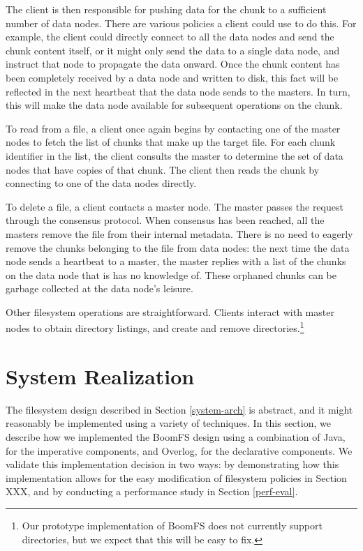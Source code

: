 \documentclass{article}
\begin{document}
The client is then responsible for pushing data for the chunk to a
sufficient number of data nodes. There are various policies a client
could use to do this. For example, the client could directly connect
to all the data nodes and send the chunk content itself, or it might
only send the data to a single data node, and instruct that node to
propagate the data onward. Once the chunk content has been completely
received by a data node and written to disk, this fact will be
reflected in the next heartbeat that the data node sends to the
masters. In turn, this will make the data node available for
subsequent operations on the chunk.

To read from a file, a client once again begins by contacting one of
the master nodes to fetch the list of chunks that make up the target
file. For each chunk identifier in the list, the client consults the
master to determine the set of data nodes that have copies of that
chunk. The client then reads the chunk by connecting to one of the
data nodes directly.

To delete a file, a client contacts a master node. The master passes
the request through the consensus protocol. When consensus has been
reached, all the masters remove the file from their internal
metadata. There is no need to eagerly remove the chunks belonging to
the file from data nodes: the next time the data node sends a
heartbeat to a master, the master replies with a list of the chunks on
the data node that is has no knowledge of. These orphaned chunks can
be garbage collected at the data node's leisure.

Other filesystem operations are straightforward. Clients interact with
master nodes to obtain directory listings, and create and remove
directories.\footnote{Our prototype implementation of BoomFS does not
  currently support directories, but we expect that this will be easy
  to fix.}

\section{System Realization}
\label{system-realize}
The filesystem design described in Section \ref{system-arch} is
abstract, and it might reasonably be implemented using a variety of
techniques. In this section, we describe how we implemented the BoomFS
design using a combination of Java, for the imperative components, and
Overlog, for the declarative components. We validate this
implementation decision in two ways: by demonstrating how this
implementation allows for the easy modification of filesystem policies
in Section XXX, and by conducting a performance study in Section
\ref{perf-eval}.
\end{document}
